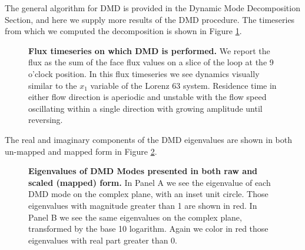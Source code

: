\documentclass[10pt,letterpaper]{article}
\begin{document}
The general algorithm for DMD is provided in the Dynamic Mode Decomposition Section, and here we supply more results of the DMD procedure.
The timeseries from which we computed the decomposition is shown in Figure \ref{fig:DMD-timeseries}.

\begin{figure}[h]
  \centering
  \caption[]{
\textbf{    Flux timeseries on which DMD is performed.
}    We report the flux as the sum of the face flux values on a slice of the loop at the 9 o'clock position.
    In this flux timeseries we see dynamics visually similar to the $x_1$ variable of the Lorenz 63 system.
    Residence time in either flow direction is aperiodic and unstable with the flow speed oscillating within a single direction with growing amplitude until reversing.
  }
  \label{fig:DMD-timeseries}  
\end{figure}

The real and imaginary components of the DMD eigenvalues are shown in both un-mapped and mapped form in Figure \ref{fig:DMD-eigenvalues}.

\begin{figure}[h]
  \centering
  \caption[]{
\textbf{    Eigenvalues of DMD Modes presented in both raw and scaled (mapped) form.
}    In Panel A we see the eigenvalue of each DMD mode on the complex plane, with an inset unit circle.
    Those eigenvalues with magnitude greater than 1 are shown in red.
    In Panel B we see the same eigenvalues on the complex plane, transformed by the base 10 logarithm.
    Again we color in red those eigenvalues with real part greater than 0.
  }
  \label{fig:DMD-eigenvalues}  
\end{figure}
\end{document}
